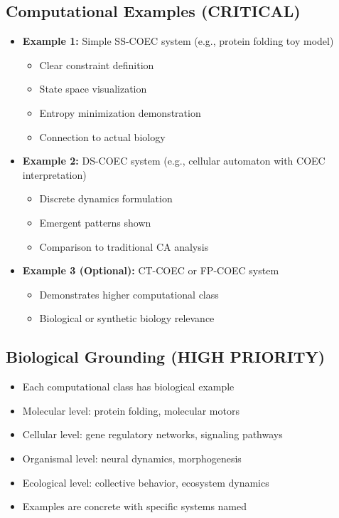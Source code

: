 \documentclass[11pt]{article}
\begin{document}
\subsection{Computational Examples (\textcolor{urgent}{CRITICAL})}

\begin{itemize}[label=$\square$]
    \item \textbf{Example 1:} Simple SS-COEC system (e.g., protein folding toy model)
    \begin{itemize}[label=$\circ$]
        \item Clear constraint definition
        \item State space visualization
        \item Entropy minimization demonstration
        \item Connection to actual biology
    \end{itemize}

    \item \textbf{Example 2:} DS-COEC system (e.g., cellular automaton with COEC interpretation)
    \begin{itemize}[label=$\circ$]
        \item Discrete dynamics formulation
        \item Emergent patterns shown
        \item Comparison to traditional CA analysis
    \end{itemize}

    \item \textbf{Example 3 (Optional):} CT-COEC or FP-COEC system
    \begin{itemize}[label=$\circ$]
        \item Demonstrates higher computational class
        \item Biological or synthetic biology relevance
    \end{itemize}
\end{itemize}

\subsection{Biological Grounding (\textcolor{important}{HIGH PRIORITY})}

\begin{itemize}[label=$\square$]
    \item Each computational class has biological example
    \item Molecular level: protein folding, molecular motors
    \item Cellular level: gene regulatory networks, signaling pathways
    \item Organismal level: neural dynamics, morphogenesis
    \item Ecological level: collective behavior, ecosystem dynamics
    \item Examples are concrete with specific systems named
\end{itemize}
\end{document}
